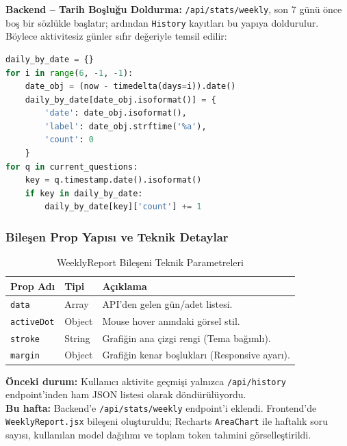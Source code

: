 \documentclass[12pt,a4paper]{article}
\begin{document}
\textbf{Backend -- Tarih Boşluğu Doldurma:} \texttt{/api/stats/weekly}, son 7 günü önce boş bir sözlükle başlatır; ardından \texttt{History} kayıtları bu yapıya doldurulur. Böylece aktivitesiz günler sıfır değeriyle temsil edilir:

\begin{lstlisting}[language=Python, caption=app.py -- 7 Günlük Boş Çerçeve Üretimi (satır 6385--6398)]
daily_by_date = {}
for i in range(6, -1, -1):
    date_obj = (now - timedelta(days=i)).date()
    daily_by_date[date_obj.isoformat()] = {
        'date': date_obj.isoformat(),
        'label': date_obj.strftime('%a'),
        'count': 0
    }
for q in current_questions:
    key = q.timestamp.date().isoformat()
    if key in daily_by_date:
        daily_by_date[key]['count'] += 1
\end{lstlisting}

\subsubsection{Bileşen Prop Yapısı ve Teknik Detaylar}
\begin{table}[h!]
  \centering\small
  \begin{tabular}{@{} P{3cm} P{3cm} P{7cm} @{}}
    \toprule
    \textbf{Prop Adı} & \textbf{Tipi} & \textbf{Açıklama} \\
    \midrule
    \texttt{data} & Array & API'den gelen gün/adet listesi. \\
    \texttt{activeDot} & Object & Mouse hover anındaki görsel stil. \\
    \texttt{stroke} & String & Grafiğin ana çizgi rengi (Tema bağımlı). \\
    \texttt{margin} & Object & Grafiğin kenar boşlukları (Responsive ayarı). \\
    \bottomrule
  \end{tabular}
  \caption{WeeklyReport Bileşeni Teknik Parametreleri}
\end{table}

\begin{infobox}
  \small
  \textbf{Önceki durum:} Kullanıcı aktivite geçmişi yalnızca \texttt{/api/history} endpoint'inden ham JSON listesi olarak döndürülüyordu.\\
  \textbf{Bu hafta:} Backend'e \texttt{/api/stats/weekly} endpoint'i eklendi. Frontend'de \texttt{WeeklyReport.jsx} bileşeni oluşturuldu; Recharts \texttt{AreaChart} ile haftalık soru sayısı, kullanılan model dağılımı ve toplam token tahmini görselleştirildi.
\end{infobox}
\end{document}
